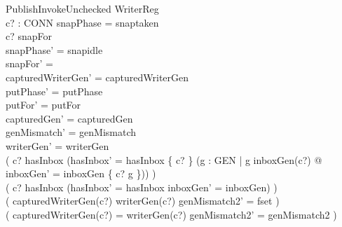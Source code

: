 \documentclass[a4paper,10pt,fleqn]{article}
\begin{document}
\begin{schema}{PublishInvokeUnchecked}
  \Delta WriterReg \\
  c? : CONN
\where
  snapPhase = snaptaken \\
  c? \in snapFor \\
  snapPhase' = snapidle \\
  snapFor' = \emptyset \\
  capturedWriterGen' = capturedWriterGen \\
  putPhase' = putPhase \\
  putFor' = putFor \\
  capturedGen' = capturedGen \\
  genMismatch' = genMismatch \\
  writerGen' = writerGen \\
  ( c? \notin hasInbox \implies
      (hasInbox' = hasInbox \cup \{ c? \} \land
       (\exists g : GEN | g \neq inboxGen(c?) @
         inboxGen' = inboxGen \oplus \{ c? \mapsto g \})) ) \\
  ( c? \in hasInbox \implies
      (hasInbox' = hasInbox \land inboxGen' = inboxGen) ) \\
  ( capturedWriterGen(c?) \neq writerGen(c?) \implies genMismatch2' = fset ) \\
  ( capturedWriterGen(c?) = writerGen(c?) \implies genMismatch2' = genMismatch2 )
\end{schema}
\end{document}
